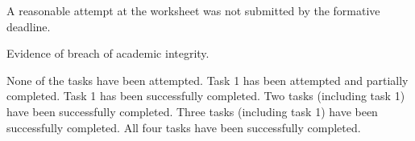 \documentclass{../../../fal_assignment}
\begin{document}
\begin{markingrubric}

		\grade\fail	A reasonable attempt at the worksheet was not submitted by the formative deadline.
		\par Evidence of breach of academic integrity.
		
        \grade\fail None of the tasks have been attempted.
		\grade Task 1 has been attempted and partially completed.
		\grade Task 1 has been successfully completed.
		\grade Two tasks (including task 1) have been successfully completed.
		\grade Three tasks (including task 1) have been successfully completed.
		\grade All four tasks have been successfully completed.


\end{markingrubric}
\end{document}
